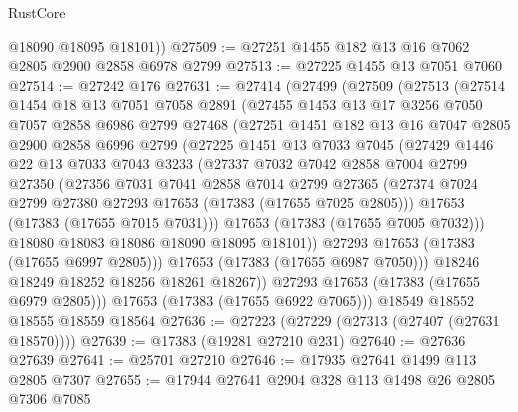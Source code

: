 \begin{lexlean}{RustCore}
\begin{coremodule}
        @18090
        @18095
        @18101))
@27509 := @27251 @1455 @182 @13 @16 @7062 @2805 @2900 @2858 @6978 @2799
@27513 := @27225 @1455 @13 @7051 @7060
@27514 := @27242 @176
@27631 := @27414
    (@27499
      (@27509
        (@27513
          (@27514
            @1454
            @18
            @13
            @7051
            @7058
            @2891
            (@27455
              @1453
              @13
              @17
              @3256
              @7050
              @7057
              @2858
              @6986
              @2799
              @27468
              (@27251
                @1451
                @182
                @13
                @16
                @7047
                @2805
                @2900
                @2858
                @6996
                @2799
                (@27225
                  @1451
                  @13
                  @7033
                  @7045
                  (@27429
                    @1446
                    @22
                    @13
                    @7033
                    @7043
                    @3233
                    (@27337
                      @7032
                      @7042
                      @2858
                      @7004
                      @2799
                      @27350
                      (@27356
                        @7031
                        @7041
                        @2858
                        @7014
                        @2799
                        @27365
                        (@27374 @7024 @2799 @27380 @27293 @17653 (@17383 (@17655 @7025 @2805)))
                        @17653
                        (@17383 (@17655 @7015 @7031)))
                      @17653
                      (@17383 (@17655 @7005 @7032)))
                    @18080
                    @18083
                    @18086
                    @18090
                    @18095
                    @18101))
                @27293
                @17653
                (@17383 (@17655 @6997 @2805)))
              @17653
              (@17383 (@17655 @6987 @7050)))
            @18246
            @18249
            @18252
            @18256
            @18261
            @18267))
        @27293
        @17653
        (@17383 (@17655 @6979 @2805)))
      @17653
      (@17383 (@17655 @6922 @7065)))
    @18549
    @18552
    @18555
    @18559
    @18564
@27636 := @27223 (@27229 (@27313 (@27407 (@27631 @18570))))
@27639 := @17383 (@19281 @27210 @231)
@27640 := @27636 @27639
@27641 := @25701 @27210
@27646 := @17935 @27641 @1499 @113 @2805 @7307
@27655 := @17944 @27641 @2904 @328 @113 @1498 @26 @2805 @7306 @7085

\end{coremodule}
\end{lexlean}
